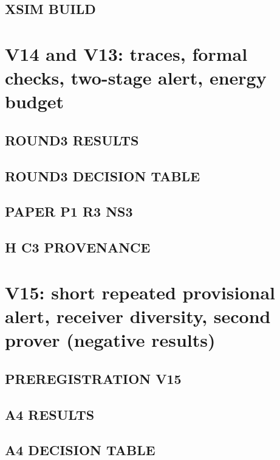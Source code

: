 \documentclass[10pt,a4paper]{article}
\begin{document}
\subsection{XSIM BUILD}


\section{V14 and V13: traces, formal checks, two-stage alert, energy budget}

\subsection{ROUND3 RESULTS}


\subsection{ROUND3 DECISION TABLE}


\subsection{PAPER P1 R3 NS3}


\subsection{H C3 PROVENANCE}


\section{V15: short repeated provisional alert, receiver diversity, second prover (negative results)}

\subsection{PREREGISTRATION V15}


\subsection{A4 RESULTS}


\subsection{A4 DECISION TABLE}

\end{document}
